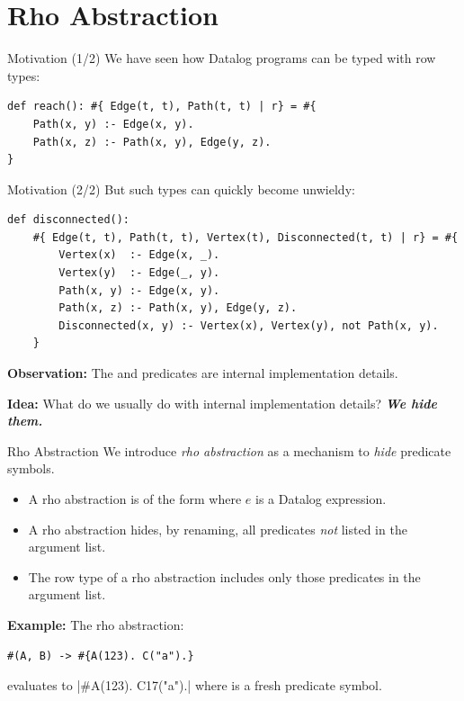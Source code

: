 

\section{Rho Abstraction}

\begin{frame}[fragile]{Motivation (1/2)}
We have seen how Datalog programs can be typed with row types:
%
\begin{lstlisting}[language=flix, xleftmargin=0.8cm]
def reach(): #{ Edge(t, t), Path(t, t) | r} = #{
    Path(x, y) :- Edge(x, y).
    Path(x, z) :- Path(x, y), Edge(y, z).
}
\end{lstlisting}
\end{frame}

\begin{frame}[fragile]{Motivation (2/2)}
But such types can quickly become unwieldy:
%
\begin{lstlisting}[language=flix, xleftmargin=0.5cm]
def disconnected(): 
    #{ Edge(t, t), Path(t, t), Vertex(t), Disconnected(t, t) | r} = #{
        Vertex(x)  :- Edge(x, _).
        Vertex(y)  :- Edge(_, y).
        Path(x, y) :- Edge(x, y).
        Path(x, z) :- Path(x, y), Edge(y, z).
        Disconnected(x, y) :- Vertex(x), Vertex(y), not Path(x, y).
    }
\end{lstlisting}

\pause

\textbf{Observation:} The  and  predicates are internal
implementation details.

\pause

\textbf{Idea:} What do we usually do with internal implementation details? \textbf{\emph{We hide them.}}
\end{frame}

\begin{frame}[fragile]{Rho Abstraction}
We introduce \emph{rho abstraction} as a mechanism to \emph{hide} predicate symbols.

\small
\begin{itemize}
    \item A rho abstraction is of the form  where $e$ is a Datalog expression.
    \pause \item A rho abstraction hides, by renaming, all predicates \emph{not}
    listed in the argument list. 
    \pause \item The row type of a rho abstraction includes only those predicates in
    the argument list. 
\end{itemize}

\pause

\textbf{Example:} The rho abstraction:
%
\begin{lstlisting}[language=flix, xleftmargin=0.5cm]
#(A, B) -> #{A(123). C("a").}
\end{lstlisting}
%
evaluates to \Code|#{A(123). C17("a").}| where  is a fresh predicate
symbol.
\end{frame}


